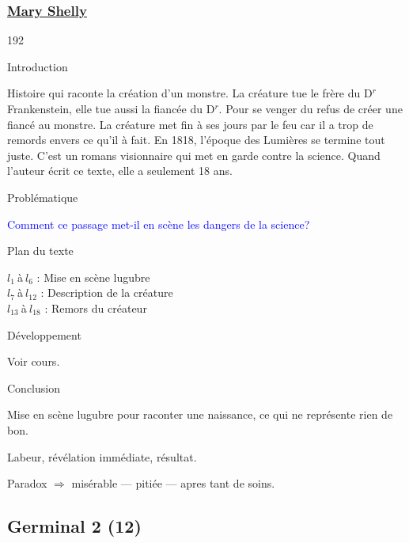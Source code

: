 \documentclass[12pt,a4paper]{article}
\begin{document}
				\subsubsection{\href{.extra/Bio/Shelly.pdf}{Mary Shelly}}
\begin{dingautolist}{192}

\item Introduction \par
Histoire qui raconte la création d'un monstre. La créature tue le frère du D$^r$ Frankenstein, elle tue aussi la fiancée du D$^r$. Pour se venger du refus de créer une fiancé au monstre. La créature met fin à ses jours par le feu car il a trop de remords envers ce qu'il à fait. En 1818, l'époque des Lumières se termine tout juste. C'est un romans visionnaire qui met en garde contre la science. Quand l'auteur écrit ce texte, elle a seulement 18 ans.
\item Probl\'ematique \par
	\textcolor{blue}{Comment ce passage met-il en scène les dangers de la science?}
\item Plan du texte \par
	$l_{1}~$\`a$~l_{6}$ : Mise en scène lugubre\\
    $l_{7}~$\`a$~l_{12}$ : Description de la créature\\
    $l_{13}~$\`a$~l_{18}$ : Remors du créateur


\item D\'eveloppement \par
        Voir cours.

\item Conclusion \par
Mise en scène lugubre pour raconter une naissance, ce qui ne représente rien de bon.\par
Labeur, révélation immédiate, résultat.\par
Paradox $\Rightarrow$ misérable --- pitiée --- apres tant de soins.


\end{dingautolist}


\newpage
\subsection{Germinal 2 (12)}
\end{document}
